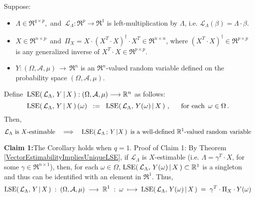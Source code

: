 \begin{corollary}
\label{LSEofEstimableFunctionsAreRandomVariables}
\mbox{}\vskip 0.1cm\noindent
Suppose:
\begin{itemize}
\item
	$\Lambda \in \Re^{q \times p}$,\,
	and
	\,$\mathcal{L}_{\Lambda} : \Re^{p} \longrightarrow \Re^{1}$ is left-multiplication by $\Lambda$,
	i.e. $\mathcal{L}_{\Lambda}(\beta) = \Lambda \cdot \beta$.
\item
	$X \in \Re^{n \times p}$\, and \,$\Pi_{X} = X\cdot(X^{T}\cdot X)^{\dagger}\cdot X^{T} \in \Re^{n \times n}$,
	where $(X^{T}\cdot X)^{\dagger} \in \Re^{p \times p}$ is any generalized inverse of
	$X^{T}\cdot X \in \Re^{p \times p}$.
\item
	$Y : (\Omega,\mathcal{A},\mu) \,\longrightarrow\, \Re^{n}$ is an $\Re^{n}$-valued
	random variable defined on the probability space $(\Omega,\mathcal{A},\mu)$.
\end{itemize}
Define \,$\textnormal{LSE}\!\left(\,\mathcal{L}_{\Lambda},\,Y\,\vert\,X\,\right) : (\Omega,\mathcal{A},\mu) \longrightarrow \mathbb{R}^{n}$
as follows:
\begin{equation*}
\textnormal{LSE}\!\left(\,\mathcal{L}_{\Lambda},\,Y\,\vert\,X\,\right)(\omega)
\;\; := \;\; \textnormal{LSE}\!\left(\,\mathcal{L}_{\Lambda},\,Y(\omega)\,\vert\,X\,\right)\,,
\quad\;\;
\textnormal{for each \,$\omega \in \Omega$}\,.
\end{equation*}
Then,
\begin{equation*}
\textnormal{$\mathcal{L}_{\Lambda}$ is $X$-estimable}
\quad\Longrightarrow\quad
\textnormal{$\textnormal{LSE}\!\left(\,\mathcal{L}_{\Lambda} \,;\, Y\,\vert X\,\right)$\, is a well-defined $\mathbb{R}^{1}$-valued random variable}
\end{equation*}
\end{corollary}
\proof
\vskip 0.2cm
\noindent
\textbf{Claim 1:}\quad The Corollary holds when $q = 1$.
\vskip 0.2cm
\noindent
Proof of Claim 1:\quad
By Theorem \ref{VectorEstimabilityImpliesUniqueLSE},
if $\mathcal{L}_{\Lambda}$ is $X$-estimable (i.e. $\Lambda = \gamma^{T} \cdot X$, for some $\gamma \in \Re^{n \times 1}$),
then, for each $\omega \in \Omega$,
$\textnormal{LSE}\!\left(\,\mathcal{L}_{\Lambda},\,Y(\omega)\,\vert\,X\,\right) \subset \mathbb{R}^{1}$
is a singleton and thus can be identified with an element in $\Re^{1}$.
Thus,
\begin{equation*}
\textnormal{LSE}\!\left(\,\mathcal{L}_{\Lambda},\,Y\,\vert\,X\,\right)
\;:\; (\Omega,\mathcal{A},\mu) \; \longrightarrow \; \mathbb{R}^{1}
\;:\; \omega \; \longmapsto \; \textnormal{LSE}\!\left(\,\mathcal{L}_{\Lambda},\,Y(\omega)\,\vert\,X\,\right) \;=\; \gamma^{T} \cdot \Pi_{X} \cdot Y(\omega)
\end{equation*}
